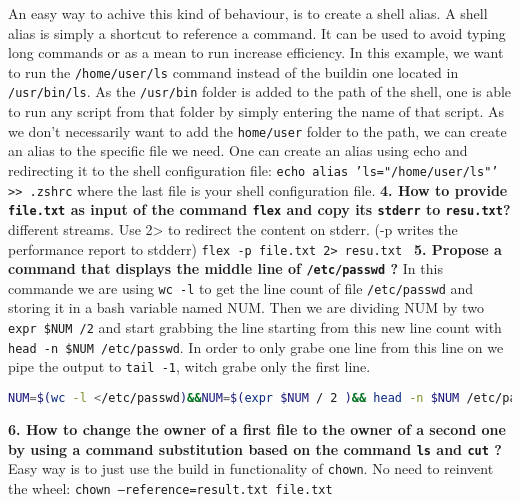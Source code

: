 \documentclass[a4paper,oneside,onecolumn]{article}
\newcommand{\code}[1]{\colorbox{codegray}{\texttt{#1}}}
\begin{document}
\newline
\newline
An easy way to achive this kind of behaviour, is to create a shell alias. A shell alias is simply a shortcut to reference a command. It can be used to avoid typing long commands or as a mean to run increase efficiency.
In this example, we want to run the \texttt{/home/user/ls} command instead of the buildin one located in \texttt{/usr/bin/ls}. As the \texttt{/usr/bin} folder is added to the path of the shell, one is able to run any script from that folder by simply entering the name of that script.
\newline
As we don't necessarily want to add the \texttt{home/user} folder to the path, we can create an alias to the specific file we need. 
\newline
\newline
One can create an alias using echo and redirecting it to the shell configuration file: 
\newline
\code{echo alias 'ls="/home/user/ls"' >> .zshrc} where the last file is your shell configuration file.
\newline
\newline
\noindent
\textbf{4. How to provide \texttt{file.txt} as input of the command \code{flex} and copy its \texttt{stderr} to \texttt{resu.txt}?}
\newline
{} different streams. Use 2> to redirect the content on stderr. (-p writes the performance report to stdderr)
\newline
\code{flex -p file.txt 2> resu.txt }
\newline
\newline
\noindent
\textbf{5. Propose a command that displays the middle line of \texttt{/etc/passwd} ?}
\newline
\newline
In this commande we are using \code{wc -l} to get the line count of file \texttt{/etc/passwd} and storing it in a bash variable named NUM. Then we are dividing NUM by two \code{expr \$NUM /2} and start grabbing the line starting from this new line count with \code{head -n \$NUM /etc/passwd}. In order to only grabe one line from this line on we pipe the output to \code{tail -1}, witch grabe only the first line.
\newline
\begin{lstlisting}[language=bash,caption={bash version}]
NUM=$(wc -l </etc/passwd)&&NUM=$(expr $NUM / 2 )&& head -n $NUM /etc/passwd | tail -1
\end{lstlisting}
\noindent
\textbf{6. How to change the owner of a first file to the owner of a second one by using a command substitution based on the command \code{ls} and \code{cut} ?}
\newline
\newline
Easy way is to just use the build in functionality of \code{chown}. No need to reinvent the wheel:
\newline
\code{chown --reference=result.txt file.txt}
\end{document}
